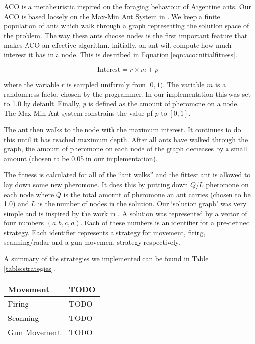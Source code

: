 ACO is a metaheuristic inspired on the foraging behaviour of Argentine ants. Our ACO is based loosely on the Max-Min Ant System in \cite{stutzle2000max}. We keep a finite population of ants which walk through a graph representing the solution space of the problem. The way these ants choose nodes is the first important feature that makes ACO an effective algorithm. Initially, an ant will compute how much interest it has in a node. This is described in Equation \ref{eqn:aco:initialfitness}.

\begin{equation}
\label{eqn:aco:initialfitness}
\text{Interest} = r \times m + p
\end{equation}

\noindent where the variable $r$ is sampled uniformly from $[0, 1)$. The variable $m$ is a randomness factor chosen by the programmer. In our implementation this was set to 1.0 by default. Finally, $p$ is defined as the amount of pheromone on a node. The Max-Min Ant system constrains the value pf $p$ to $[0, 1]$. 

The ant then walks to the node with the maximum interest. It continues to do this until it has reached maximum depth. After all ants have walked through the graph, the amount of pheromone on each node of the graph decreases by a small amount (chosen to be 0.05 in our implementation).

The fitness is calculated for all of the ``ant walks'' and the fittest ant is allowed to lay down some new pheromone. It does this by putting down $Q/L$ pheromone on each node where $Q$ is the total amount of pheromone an ant carries (chosen to be 1.0) and $L$ is the number of nodes in the solution. Our `solution graph' was very simple and is inspired by the work in \cite{emergentbehaviours}. A solution was represented by a vector of four numbers $(a, b, c, d)$. Each of these numbers is an identifier for a pre-defined strategy. Each identifier represents a strategy for movement, firing, scanning/radar and a gun movement strategy respectively.


A summary of the strategies we implemented can be found in Table \ref{table:strategies}.

\begin{table*}
\centering
\begin{tabular}{|l|l|}
\hline
Movement & TODO \\
\hline
Firing & TODO \\
\hline
Scanning & TODO \\
\hline
Gun Movement & TODO \\
\hline
\end{tabular}
\caption{A Summary of the Strategies Combined in to form the Solution-Space of the Ant Colony Optimization and Genetic Algorithms}
\label{table:strategies}
\end{table*}

